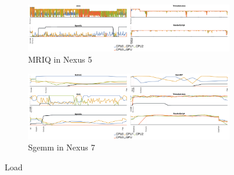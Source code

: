 \begin{figure}[ht]
% 
  \begin{subfigure}[b]{\textwidth}
      \centering
      \includegraphics[width=\textwidth]{data/load_mriq_nexus5.pdf}
      \caption{MRIQ in Nexus 5}
      \label{fig:MRIQ}
  \end{subfigure}

% 

   \begin{subfigure}[b]{\textwidth}
       \centering
       \includegraphics[width=\textwidth]{data/load_sgemm_nexus7.pdf}
       \caption{Sgemm in Nexus 7}\label{fig:Sgemm}
   \end{subfigure}

  \caption{Load}
\end{figure}


